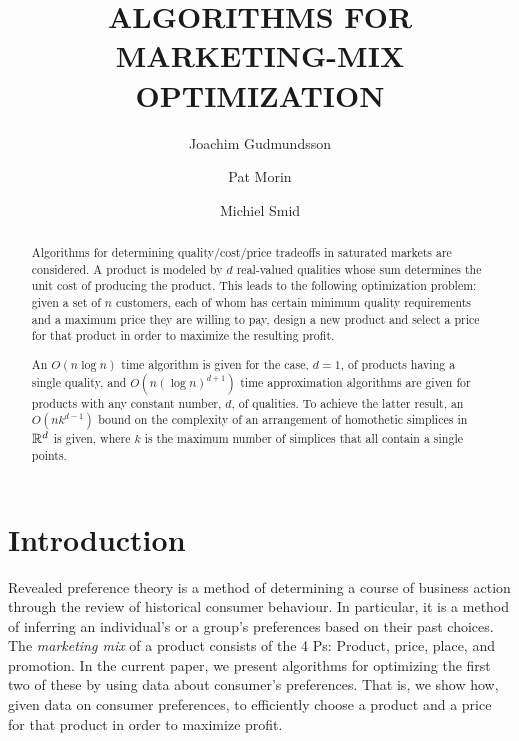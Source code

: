 \documentclass[lotsofwhite]{patmorin}
\title{\MakeUppercase{Algorithms for Marketing-Mix Optimization}}
\author{Joachim Gudmundsson%
	\and Pat Morin%
	\and Michiel Smid}
\begin{document}
\maketitle
\begin{abstract}
  Algorithms for determining quality/cost/price tradeoffs in saturated
  markets are considered.  A product is modeled by $d$ real-valued
  qualities whose sum determines the unit cost of producing the product.
  This leads to the following optimization problem: given a set of $n$
  customers, each of whom has certain minimum quality requirements and a
  maximum price they are willing to pay, design a new product and select
  a price for that product in order to maximize the resulting profit.

  An $O(n\log n)$ time algorithm is given for the case, $d=1$, of products
  having a single quality, and $O(n(\log n)^{d+1})$ time approximation
  algorithms are given for products with any constant number, $d$,
  of qualities.  To achieve the latter result, an $O(nk^{d-1})$ bound
  on the complexity of an arrangement of homothetic simplices in $\mathbb{R}^d$
  is given, where $k$ is the maximum number of simplices that all contain
  a single points.
\end{abstract}

\section{Introduction}

Revealed preference theory \cite{v06} is a method of determining a course
of business action through the review of historical consumer behaviour.  In
particular, it is a method of inferring an individual's or a group's
preferences based on their past choices.  The \emph{marketing mix}
\cite{kpkl05} of a product consists of the 4 Ps: Product, price, place, and
promotion.  In the current paper, we present algorithms for optimizing the
first two of these by using data about consumer's preferences.  That is, we
show how, given data on consumer preferences, to efficiently choose a
product and a price for that product in order to maximize profit.
\end{document}
